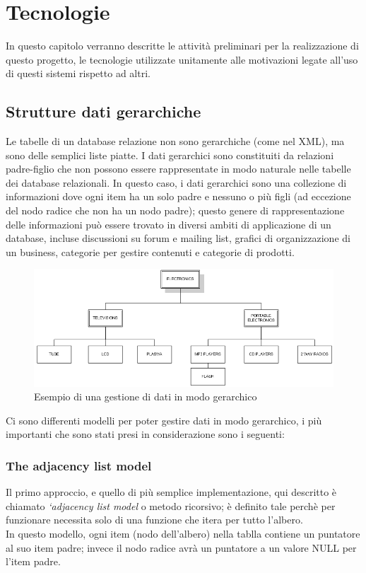 \chapter{Tecnologie}
In questo capitolo verranno descritte le attività preliminari per la realizzazione di questo progetto, le tecnologie utilizzate
unitamente alle motivazioni legate all'uso di questi sistemi rispetto ad altri.

\section{Strutture dati gerarchiche}
Le tabelle di un database relazione non sono gerarchiche (come nel XML), ma sono delle semplici liste piatte. I dati gerarchici sono 
constituiti da relazioni padre-figlio che non possono essere rappresentate in modo naturale nelle tabelle dei database relazionali.
In questo caso, i dati gerarchici sono una collezione di informazioni dove ogni item ha un solo padre e nessuno o più figli
(ad eccezione del nodo radice che non ha un nodo padre); questo genere di rappresentazione delle informazioni può essere trovato in 
diversi ambiti di applicazione di un database, incluse discussioni su forum e mailing list, grafici di organizzazione di un business, 
categorie per gestire contenuti e categorie di prodotti. \\

\newpage

\begin{figure}[H]
	\includegraphics[scale=0.7]{images/Hierarchical_Data_ex.PNG}
	\caption{Esempio di una gestione di dati in modo gerarchico}
	\label{fig:Hde}
\end{figure}

Ci sono differenti modelli per poter gestire dati in modo gerarchico, i più importanti che sono stati presi in considerazione sono i 
seguenti:

\subsection{The adjacency list model}
Il primo approccio, e quello di più semplice implementazione, qui descritto è chiamato \textit{‘adjacency list model} o metodo ricorsivo;
è definito tale perchè per funzionare necessita solo di una funzione che itera per tutto l'albero.\\
In questo modello, ogni item (nodo dell'albero) nella tablla contiene un puntatore al suo item padre; invece il nodo radice avrà un puntatore a un valore
NULL per l'item padre.

